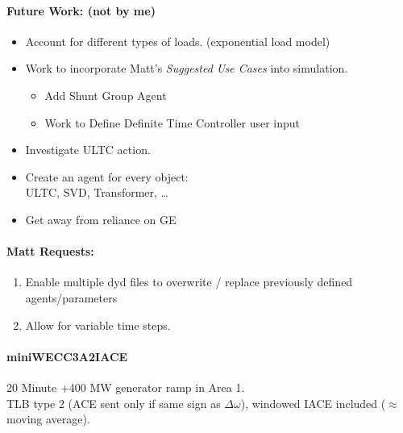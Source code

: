 \documentclass[12pt]{article}
\newcommand{\caseName}{ }
\begin{document}
\begin{multicols}{2}
\begin{enumerate}
\begin{enumerate}
	\end{enumerate}
\paragraph{Future Work: (not by me)}
\begin{itemize}
\item Account for different types of loads. (exponential load model) %
\item Work to incorporate Matt's \emph{Suggested Use Cases} into simulation.
		\begin{itemize}
		\item Add Shunt Group Agent
		\item Work to Define Definite Time Controller user input
		\end{itemize} 


		\item Investigate ULTC action.

		\item Create an agent for every object: \\ ULTC, SVD, Transformer, \ldots

		\item Get away from reliance on GE
		
\end{itemize}

\paragraph{Matt Requests:}
\begin{enumerate}
		\item Enable multiple dyd files to overwrite / replace previously defined agents/parameters
		\item Allow for variable time steps.
\end{enumerate}

	\end{enumerate}



\vfill\null

\end{multicols}
\pagebreak
\renewcommand{\caseName}{miniWECC3A2IACE}
\paragraph{miniWECC3A2IACE} 20 Minute +400 MW generator ramp in Area 1. \\
TLB type 2 (ACE sent only if same sign as $\Delta\omega$), windowed IACE included ($\approx$ moving average). 
\end{document}
